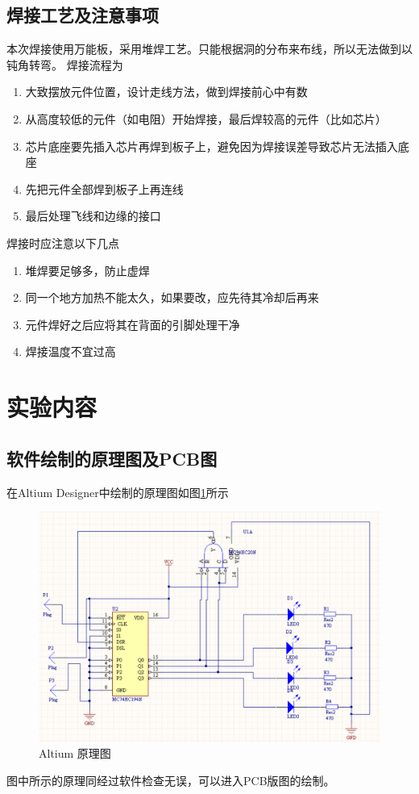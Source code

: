 \documentclass{ctexart}
\begin{document}
\subsection{焊接工艺及注意事项}
本次焊接使用万能板，采用堆焊工艺。只能根据洞的分布来布线，所以无法做到以钝角转弯。
焊接流程为
\begin{enumerate}
    \item 大致摆放元件位置，设计走线方法，做到焊接前心中有数
    \item 从高度较低的元件（如电阻）开始焊接，最后焊较高的元件（比如芯片）
    \item 芯片底座要先插入芯片再焊到板子上，避免因为焊接误差导致芯片无法插入底座
    \item 先把元件全部焊到板子上再连线
    \item 最后处理飞线和边缘的接口
\end{enumerate}
焊接时应注意以下几点
\begin{enumerate}
    \item 堆焊要足够多，防止虚焊
    \item 同一个地方加热不能太久，如果要改，应先待其冷却后再来
    \item 元件焊好之后应将其在背面的引脚处理干净
    \item 焊接温度不宜过高
\end{enumerate}
\section{实验内容}
\subsection{软件绘制的原理图及PCB图}
在Altium Designer中绘制的原理图如图\ref{altium原理图}所示
\begin{figure}[H]
    \centering
    \includegraphics[scale=0.7]{pic/altium原理图.png}
    \caption{Altium 原理图}
    \label{altium原理图}
\end{figure}
图中所示的原理同经过软件检查无误，可以进入PCB版图的绘制。
\end{document}
